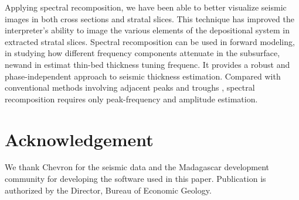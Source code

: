 Applying spectral recomposition, we have been able to better visualize seismic images in both cross sections and stratal slices. This technique has improved the interpreter's ability to image the various elements of the depositional system in extracted stratal slices. Spectral recomposition can  be used in forward modeling,  in studying how different frequency components attenuate in the subsurface, new{and in}  estimat thin-bed thickness   tuning frequenc. It provides a robust and phase-independent approach to seismic thickness estimation. Compared with conventional methods involving adjacent peaks and troughs  , spectral recomposition requires only peak-frequency and amplitude estimation.

\section{Acknowledgement}
We thank Chevron for the seismic data and the Madagascar development community for developing the software used in this paper. Publication is authorized by the Director, Bureau of Economic Geology. 




